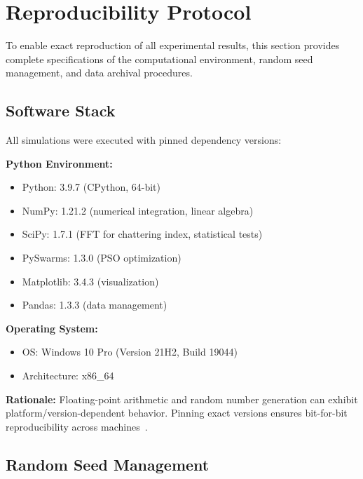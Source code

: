 \section{Reproducibility Protocol}
\label{sec:reproducibility}

To enable exact reproduction of all experimental results, this section provides complete specifications of the computational environment, random seed management, and data archival procedures.

\subsection{Software Stack}
\label{subsec:software_stack}

All simulations were executed with pinned dependency versions:

\textbf{Python Environment:}
\begin{itemize}
    \item Python: 3.9.7 (CPython, 64-bit)
    \item NumPy: 1.21.2 (numerical integration, linear algebra)
    \item SciPy: 1.7.1 (FFT for chattering index, statistical tests)
    \item PySwarms: 1.3.0 (PSO optimization)
    \item Matplotlib: 3.4.3 (visualization)
    \item Pandas: 1.3.3 (data management)
\end{itemize}

\textbf{Operating System:}
\begin{itemize}
    \item OS: Windows 10 Pro (Version 21H2, Build 19044)
    \item Architecture: x86\_64
\end{itemize}

\textbf{Rationale:} Floating-point arithmetic and random number generation can exhibit platform/version-dependent behavior. Pinning exact versions ensures bit-for-bit reproducibility across machines~\cite{stodden2014implementing}.

\subsection{Random Seed Management}
\label{subsec:random_seeds}

